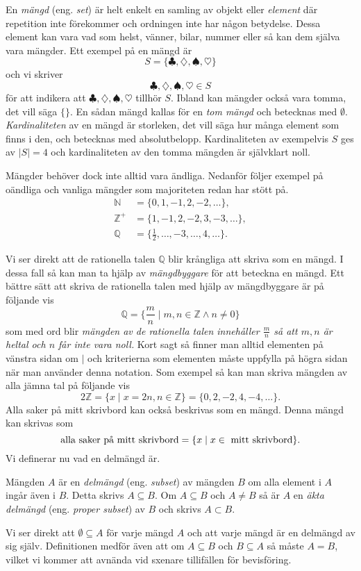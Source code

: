 \documentclass{article}
\theoremstyle{definition}
\begin{document}
En \textit{mängd} (eng. \textit{set}) är helt enkelt en samling av objekt eller \textit{element} där repetition 
inte förekommer och ordningen inte har någon betydelse.
Dessa element kan vara vad som helst, vänner, bilar, nummer eller så kan dem själva vara mängder. 
Ett exempel på en mängd är 
\[S = \{\clubsuit, \diamondsuit, \spadesuit, \heartsuit\}\]
och vi skriver
\[\clubsuit, \diamondsuit, \spadesuit, \heartsuit \in S\]
för att indikera att $\clubsuit, \diamondsuit, \spadesuit, \heartsuit$ tillhör $S$.
Ibland kan mängder också vara tomma, det vill säga $\{ \}$. En sådan mängd kallas för en \textit{tom mängd} och 
betecknas med $\emptyset$. \textit{Kardinaliteten} av en mängd är storleken, det vill säga 
hur många element som finns i den, och betecknas med absolutbelopp. 
Kardinaliteten av exempelvis $S$ ges av
$|S| = 4$ och kardinaliteten av den tomma mängden är självklart noll. 

Mängder behöver dock inte alltid vara ändliga. 
Nedanför följer exempel på oändliga och vanliga mängder som majoriteten redan har 
stött på.
\begin{align*}
    \mathbb{N} & = \{0, 1, -1, 2, -2, \ldots \}, \\
    \mathbb{Z^+} & = \{1, -1, 2, -2, 3, -3, \ldots \}, \\
    \mathbb{Q} & = \{\frac{1}{2}, \ldots, -3, \ldots, 4, \ldots \}.
\end{align*}

Vi ser direkt att de rationella talen $\mathbb{Q}$ blir krångliga att skriva som en mängd. I 
dessa fall så kan man ta hjälp av \textit{mängdbyggare} för att beteckna en mängd. 
Ett bättre sätt 
att skriva de rationella talen med hjälp av mängdbyggare är på följande vis
\[ \mathbb{Q} = \biggl\{ \frac{m}{n} \; \biggl| \; m, n \in \mathbb{Z} \land n \neq 0 \biggl\}\]
som med ord blir \textit{mängden av de rationella talen innehåller $\frac{m}{n}$ så att $m, n$ är heltal och 
$n$ får inte vara noll.} Kort sagt så finner man
alltid elementen på vänstra sidan om $|$ och kriterierna som elementen måste uppfylla på högra sidan när man 
använder denna notation. Som exempel så kan man skriva mängden av alla jämna tal på följande vis
\[2 \mathbb{Z} = \{x \; | \; x = 2n, n \in \mathbb{Z}\} = \{0, 2, -2, 4, -4, \ldots\}.\]
Alla saker på mitt skrivbord kan också beskrivas som en mängd. Denna mängd kan skrivas som
\[ \textnormal{alla saker på mitt skrivbord} = \{x \; | \; x \in \textnormal{ mitt skrivbord}\}. \]
Vi definerar nu vad en delmängd är.

\begin{mydef}{}{}
  Mängden $A$ är en \textit{delmängd} (eng. \textit{subset}) av mängden $B$ om alla element i $A$ ingår även i $B$. Detta skrivs 
  $A \subseteq B$. Om $A \subseteq B$ och $A \neq B$ så är $A$ en \textit{äkta delmängd} (eng. \textit{proper subset}) av $B$ och skrivs
  $A \subset B$.
\end{mydef}
Vi ser direkt att $\emptyset \subseteq A$ för varje mängd $A$ och att varje mängd är en delmängd av 
sig själv. Definitionen medför även att om 
$A \subseteq B$ och $B \subseteq A$ så måste $A = B$, vilket vi kommer att avnända vid sxenare tillifällen för bevisföring. 
\end{document}
